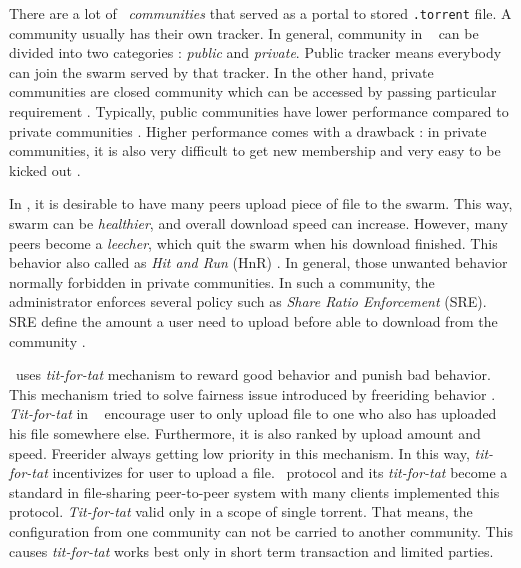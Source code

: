 There are a lot of \bt~\textit{communities} that served as a portal to stored \texttt{.torrent} file. A community usually has their own tracker. In general, community in \bt~ can be divided into two categories : \textit{public} and \textit{private}. Public tracker means everybody can join the swarm served by that tracker. In the other hand, private communities are closed community which can be accessed by passing particular requirement \cite{2010:pubpriv:meulpolder, 2014:sustainabilitytorrent:chen}. Typically, public communities have lower performance compared to private communities \cite{2010:pubpriv:meulpolder}. Higher performance comes with a drawback : in private communities, it is also very difficult to get new membership and very easy to be kicked out \cite{2013:survivepriv:jia}.

In \bt, it is desirable to have many peers upload piece of file to the swarm. This way, swarm can be \textit{healthier}, and overall download speed can increase. However, many peers become a \textit{leecher}, which quit the swarm when his download finished. This behavior also called as \textit{Hit and Run} (HnR) \cite{2014:sustainabilitytorrent:chen}. In general, those unwanted behavior normally forbidden in private communities. In such a community, the administrator enforces several policy such as \textit{Share Ratio Enforcement} (SRE). SRE define the amount a user need to upload before able to download from the community \cite{2012:economicbt:kash}. 

\bt~uses \textit{tit-for-tat} mechanism to reward good behavior and punish bad behavior. This mechanism tried to solve fairness issue introduced by freeriding behavior \cite{2003:bittorrent:cohen}. \textit{Tit-for-tat} in \bt~ encourage user to only upload file to one who also has uploaded his file somewhere else. Furthermore, it is also ranked by upload amount and speed. Freerider always getting low priority in this mechanism. In this way, \textit{tit-for-tat} incentivizes for user to upload a file. \bt~protocol and its \textit{tit-for-tat} become a standard in file-sharing peer-to-peer system with many clients implemented this protocol. \textit{Tit-for-tat} valid only in a scope of single torrent. That means, the configuration from one community can not be carried to another community. This causes \textit{tit-for-tat} works best only in short term transaction and limited parties.

